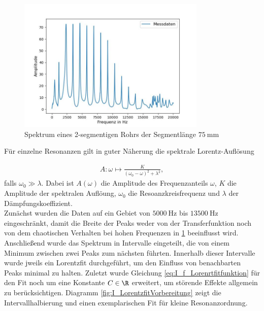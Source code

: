 \documentclass[../main.tex]{subfiles}
\begin{document}
        \begin{figure}[H]
            \centering
            \includegraphics[width=0.8\textwidth]{Bilddateien/Auswertung/I_f_Rohspektrum.jpg}
            \caption{Spektrum eines 2-segmentigen Rohrs der Segmentlänge $\SI{75}{\milli\metre}$}
            \label{fig:I_f_Rohspektrum}
        \end{figure}

        Für einzelne Resonanzen gilt in guter Näherung die spektrale Lorentz-Auflösung 
        
        \begin{align}
            A: \omega\mapsto \frac{K}{(\omega_0-\omega)^2 + \lambda^2},
            \label{eq:I_f_Lorenrtfitfunktion}
        \end{align}
        falls $\omega_0\gg \lambda$. Dabei ist $A(\omega)$ die Amplitude des Frequenzanteils $\omega$, $K$ die Amplitude der spektralen Auflöung, $\omega_0$ die Resoanzkreisfrequenz und $\lambda$ der Dämpfungskoeffizient.\\

        Zunächst wurden die Daten auf ein Gebiet von $\SI{5000}{\hertz}$ bis $\SI{13500}{\hertz}$ eingeschränkt, damit die Breite der Peaks weder von der Transferfunktion noch von dem chaotischen Verhalten bei hohen Frequenzen in \ref{fig:I_f_Rohspektrum} beeinflusst wird. Anschließend wurde das Spektrum in Intervalle eingeteilt, die von einem Minimum zwischen zwei Peaks zum nächsten führten. Innerhalb dieser Intervalle wurde jweils ein Lorentzfit durchgeführt, um den Einfluss von benachbarten Peaks minimal zu halten. Zuletzt wurde Gleichung \eqref{eq:I_f_Lorenrtfitfunktion} für den Fit noch um eine Konstante $C\in\R$ erweitert, um störende Effekte allgemein zu berücksichtigen. Diagramm \ref{fig:I_LorentzfitVorbereitung} zeigt die Intervallhalbierung und einen exemplarischen Fit für kleine Resonanzordnung.
\end{document}
